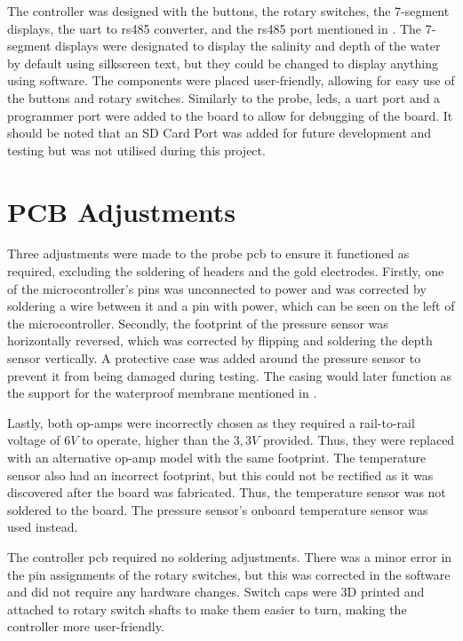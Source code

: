 The controller was designed with the buttons, the rotary switches, the 7-segment displays, the \gls{uart} to \gls{rs485} converter, and the \gls{rs485} port mentioned in .
The 7-segment displays were designated to display the salinity and depth of the water by default using silkscreen text, but they could be changed to display anything using software.
The components were placed user-friendly, allowing for easy use of the buttons and rotary switches.
Similarly to the probe, \glspl{led}, a \gls{uart} port and a programmer port were added to the board to allow for debugging of the board.
It should be noted that an SD Card Port was added for future development and testing but was not utilised during this project.

\section{PCB Adjustments}

Three adjustments were made to the probe \gls{pcb} to ensure it functioned as required, excluding the soldering of headers and the gold electrodes.
Firstly, one of the microcontroller's pins was unconnected to power and was corrected by soldering a wire between it and a pin with power, which can be seen on the left of the microcontroller.
Secondly, the footprint of the pressure sensor was horizontally reversed, which was corrected by flipping and soldering the depth sensor vertically.
A protective case was added around the pressure sensor to prevent it from being damaged during testing.
The casing would later function as the support for the waterproof membrane mentioned in .

Lastly, both op-amps were incorrectly chosen as they required a rail-to-rail voltage of $6V$ to operate, higher than the $3,3V$ provided.
Thus, they were replaced with an alternative op-amp model with the same footprint.
The temperature sensor also had an incorrect footprint, but this could not be rectified as it was discovered after the board was fabricated. 
Thus, the temperature sensor was not soldered to the board.
The pressure sensor's onboard temperature sensor was used instead.

The controller \gls{pcb} required no soldering adjustments.
There was a minor error in the pin assignments of the rotary switches, but this was corrected in the software and did not require any hardware changes.
Switch caps were 3D printed and attached to rotary switch shafts to make them easier to turn, making the controller more user-friendly.

